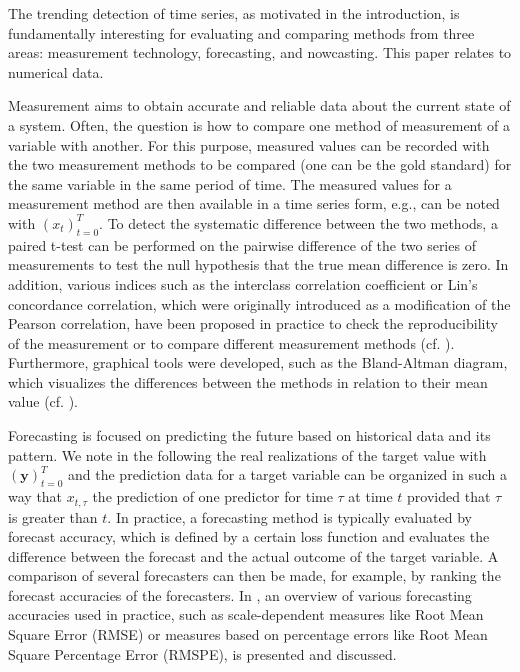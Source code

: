 
The trending detection of time series, as motivated in the introduction, is fundamentally interesting for evaluating and comparing methods from three areas: measurement technology, forecasting, and nowcasting.
This paper relates to numerical data. 

Measurement aims to obtain accurate and reliable data about the current state of a system.
Often, the question is how to compare one method of measurement of a variable with another.
For this purpose, measured values can be recorded with the two measurement methods to be compared (one can be the gold standard) for the same variable in the same period of time.
The measured values for a measurement method are then available in a time series form, e.g., can be noted with $(x_t)^T_{t=0}$. 
To detect the systematic difference between the two methods, a paired t-test can be performed on the pairwise difference of the two series of measurements to test the null hypothesis that the true mean difference is zero\cite{watson2010method}.
In addition, various indices such as the interclass correlation coefficient or Lin's concordance correlation, which were originally introduced as a modification of the Pearson correlation, have been proposed in practice to check the reproducibility of the measurement or to compare different measurement methods (cf. \cite{lawrence1989concordance,koo2016guideline,}). 
Furthermore, graphical tools were developed, such as the Bland-Altman diagram, which visualizes the differences between the methods in relation to their mean value (cf. \cite{bland1986statistical}).

Forecasting is focused on predicting the future based on historical data and its pattern.
We note in the following the real realizations of the target value with $(\mathbf{y})^T_{t=0}$ and the prediction data for a target variable can be organized in such a way that $x_{t,\tau}$ the prediction of one predictor for time $\tau$ at time $t$ provided that $\tau$ is greater than $t$. 
In practice, a forecasting method is typically evaluated by forecast accuracy, which is defined by a certain loss function and evaluates the difference between the forecast and the actual outcome of the target variable.
A comparison of several forecasters can then be made, for example, by ranking the forecast accuracies of the forecasters.
In \cite{hyndman2006another}, an overview of various forecasting accuracies used in practice, such as scale-dependent measures like Root Mean Square Error (RMSE) or measures based on percentage errors like Root Mean Square Percentage Error (RMSPE), is presented and discussed. 

